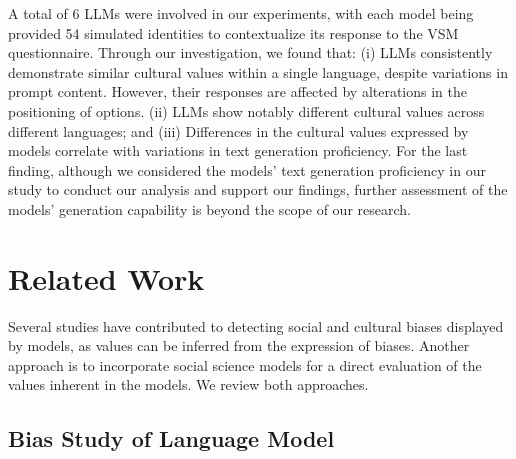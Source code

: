 \documentclass[11pt]{article}
\begin{document}
A total of 6 LLMs were involved in our experiments, with each model being provided 54 simulated identities to contextualize its response to the VSM questionnaire. Through our investigation, we found that:
(i) LLMs consistently demonstrate similar cultural values within a single language, despite variations in prompt content. However, their responses are affected by alterations in the positioning of options.
(ii) LLMs show notably different cultural values across different languages; and
(iii) Differences in the cultural values expressed by models correlate with variations in text generation proficiency.
For the last finding, although we considered the models' text generation proficiency in our study to conduct our analysis and support our findings, further assessment of the models' generation capability is beyond the scope of our research.

\section{Related Work}
\label{sec:related}
Several studies have contributed to detecting social and cultural biases displayed by models, as values can be inferred from the expression of biases. Another approach is to incorporate social science models for a direct evaluation of the values inherent in the models. We review both approaches.

\subsection{Bias Study of Language Model}
\end{document}
